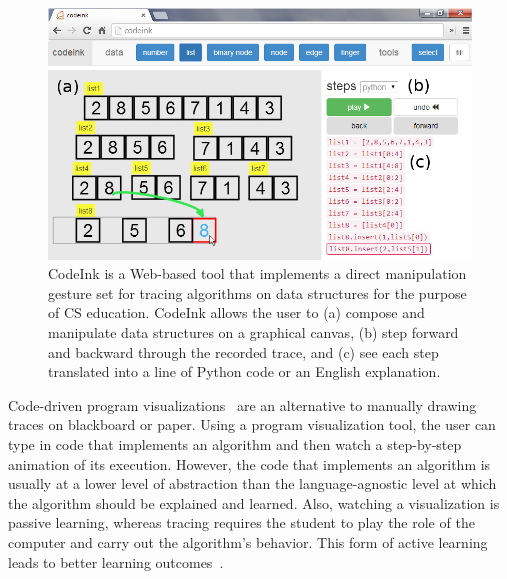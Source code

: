 \begin{figure}

\begin{center}
\includegraphics[width=\columnwidth]{img/frontpage-mergesort.png}
\end{center}

\caption{CodeInk is a Web-based tool that implements a direct
manipulation gesture set for tracing algorithms on data structures for the
purpose of CS education. CodeInk allows the user to (a) compose and
manipulate data structures on a graphical canvas, (b) step forward and
backward through the recorded trace, and (c) see each step translated
into a line of Python code or an English explanation.}


\label{fig:codeink-intro}
\end{figure}

Code-driven program visualizations~\cite{Sorva2013} are an alternative
to manually drawing traces on blackboard or paper. Using a program
visualization tool, the user can type in code that implements an
algorithm and then watch a step-by-step animation of its execution.
However, the code that implements an algorithm is usually at a lower
level of abstraction than the language-agnostic level at which the
algorithm should be explained and learned. Also, watching a
visualization is passive learning, whereas tracing requires the student
to play the role of the computer and carry out the algorithm's behavior.
This form of active learning leads to better learning
outcomes~\cite{Sorva2012Diss}.

